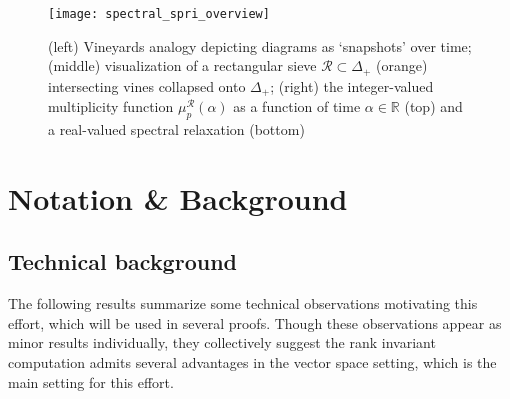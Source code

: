 \documentclass[10pt]{article}
\numberwithin{equation}{section}
\newcommand{\+}{%
	\raisebox{0.18ex}{\scaleobj{0.55}{+}}
}
\theoremstyle{definition}
\theoremstyle{definition}
\begin{document}

\begin{figure}\label{fig:overview}
\centering
\texttt{[image: spectral\_spri\_overview]}	
\caption{ (left) Vineyards analogy depicting diagrams as `snapshots' over time; (middle) visualization of a rectangular sieve $\mathcal{R} \subset \Delta_+$ (orange) intersecting vines collapsed onto $\Delta_+$; 
(right) the integer-valued multiplicity function $\mu_p^{\mathcal{R}}(\alpha)$ 
as a function of time $\alpha \in \mathbb{R}$ (top) and a real-valued spectral relaxation (bottom)
}
\end{figure}





\section{Notation \& Background}\label{sec:background_notation}


\subsection{Technical background}\label{sec:betti_derivation}

The following results summarize some technical observations motivating this effort, which will be used in several proofs. Though these observations appear as minor results individually, they collectively  suggest the rank invariant computation admits several advantages in the vector space setting, which is the main setting for this effort. 
\end{document}
